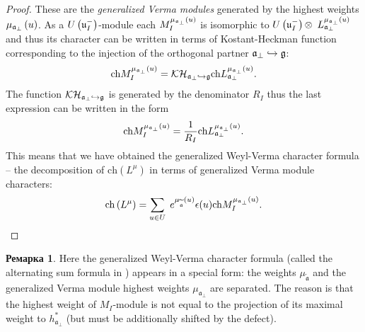 \documentclass[12pt]{article}
\theoremstyle{definition}
\newtheorem{remark}{Ремарка}
\newcommand{\aft}{\widetilde{\mathfrak{a}}}
\newcommand{\afb}{\mathfrak{a}_{\bot}}
\begin{document}
\begin{proof}
These are the \textit{generalized Verma modules}  \cite{lepowsky1977generalization}
generated by the highest weights $\mu _{\frak{a}%
_{\perp }}\left( u\right) $. As a $U\left( \frak{u}_{I}^{-}\right) $-module
each $M_{I}^{\mu _{\frak{a}_{\perp }}\left( u\right) }$ is isomorphic to $%
U\left( \frak{u}_{I}^{-}\right) \otimes $ $L_{\frak{a}_{\perp }}^{\mu _{%
\frak{a}_{\perp }}\left( u\right) }$ and thus its character can be written
in terms of Kostant-Heckman function \cite{KostantHeckman1982} corresponding
to the injection of the orthogonal partner $\frak{a}_{\perp
}\hookrightarrow \frak{g}$:
\begin{equation*}
\mathrm{ch}M_{I}^{\mu _{\frak{a}_{\perp }}\left( u\right) }=\mathcal{KH}_{%
\frak{a}_{\perp }\hookrightarrow \frak{g}}\mathrm{ch}L_{\frak{a}_{\perp
}}^{\mu _{\frak{a}_{\perp }}\left( u\right) }.
\end{equation*}
The function $\mathcal{KH}_{\frak{a}_{\perp }\hookrightarrow \frak{%
g}}$ is generated by the denominator $R_{I}$ thus the last expression can be
written in the form
\begin{equation*}
\mathrm{ch}M_{I}^{\mu _{\frak{a}_{\perp }}\left( u\right) }=\frac{1}{R_{I}}%
\mathrm{ch}L_{\frak{a}_{\perp }}^{\mu _{\frak{a}_{\perp }}\left( u\right) }.
\end{equation*}
This means that we have obtained the generalized Weyl-Verma character formula
 -- the decomposition of $\mathrm{ch}\left(
L^{\mu }\right) $ in terms of generalized Verma module characters:
\begin{equation}
\mathrm{ch}\left( L^{\mu }\right) =\sum_{u\in U}\;e^{\mu _{\aft}\left(
u\right) }\epsilon (u)\mathrm{ch}M_{I}^{\mu _{\frak{a}_{\perp }}\left(
u\right) }.  \label{char in gen verma mod}
\end{equation}
\end{proof}

\begin{remark}
Here the generalized Weyl-Verma character formula (called the alternating sum
formula in \cite{humphreys2008representations}) appears in a special
form: the weights $\mu _{\aft}$ and the generalized Verma module highest weights
$\mu _{\afb}$ are separated. The reason is that the
highest weight of $M_{I}$-module is not equal to the projection of its maximal
weight to $h^*_{\afb}$ (but must be additionally shifted by the defect).
\end{remark}
\end{document}
